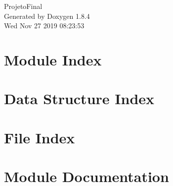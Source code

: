 \documentclass[twoside]{book}
\newcommand{\clearemptydoublepage}{%
  \newpage{\pagestyle{empty}\cleardoublepage}%
}
\begin{document}
\hypersetup{pageanchor=false}
\begin{titlepage}
\vspace*{7cm}
\begin{center}%
{\Large Projeto\-Final }\\
\vspace*{1cm}
{\large Generated by Doxygen 1.8.4}\\
\vspace*{0.5cm}
{\small Wed Nov 27 2019 08:23:53}\\
\end{center}
\end{titlepage}
\clearemptydoublepage
\tableofcontents
\clearemptydoublepage
{}
\hypersetup{pageanchor=true}

\chapter{Module Index}

\chapter{Data Structure Index}

\chapter{File Index}

\chapter{Module Documentation}








































\end{document}
